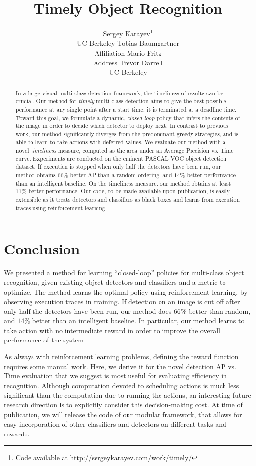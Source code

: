 \documentclass{article} %
\title{Timely Object Recognition}
\author{
Sergey Karayev\thanks{ Code available at http://sergeykarayev.com/work/timely/ } \\
UC Berkeley
\And
Tobias Baumgartner \\
Affiliation
\And
Mario Fritz \\
Address
\And
Trevor Darrell \\
UC Berkeley
}
\begin{document}
\maketitle

\begin{abstract}
In a large visual multi-class detection framework, the timeliness of results can be crucial.
Our method for \emph{timely} multi-class detection aims to give the best possible performance at any single point after a start time; it is terminated at a deadline time.
Toward this goal, we formulate a dynamic, \emph{closed-loop} policy that infers the contents of the image in order to decide which detector to deploy next.
In contrast to previous work, our method significantly diverges from the predominant greedy strategies, and is able to learn to take actions with deferred values.
We evaluate our method with a novel \emph{timeliness} measure, computed as the area under an Average Precision vs. Time curve.
Experiments are conducted on the eminent PASCAL VOC object detection dataset.
If execution is stopped when only half the detectors have been run, our method obtains $66\%$ better AP than a random ordering, and $14\%$ better performance than an intelligent baseline.
On the timeliness measure, our method obtains at least $11\%$ better performance.
Our code, to be made available upon publication, is easily extensible as it treats detectors and classifiers as black boxes and learns from execution traces using reinforcement learning.
\end{abstract}






\section{Conclusion}
We presented a method for learning ``closed-loop'' policies for multi-class object recognition, given existing object detectors and classifiers and a metric to optimize.
The method learns the optimal policy using reinforcement learning, by observing execution traces in training.
If detection on an image is cut off after only half the detectors have been run, our method does $66\%$ better than random, and $14\%$ better than an intelligent baseline. In particular, our method learns to take action with no intermediate reward in order to improve the overall performance of the system.

As always with reinforcement learning problems, defining the reward function requires some manual work.
Here, we derive it for the novel detection AP vs. Time evaluation that we suggest is most useful for evaluating efficiency in recognition.
Although computation devoted to scheduling actions is much less significant than the computation due to running the actions, an interesting future research direction is to explicitly consider this decision-making cost.
At time of publication, we will release the code of our modular framework, that allows for easy incorporation of other classifiers and detectors on different tasks and rewards.
\end{document}

